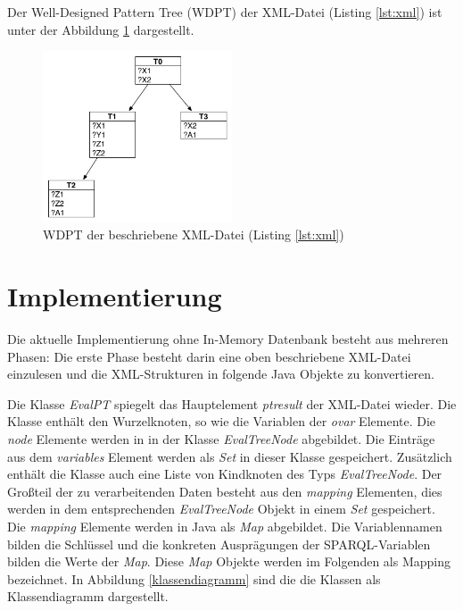 \documentclass[draft,final]{vutinfth} %
\begin{document}
Der Well-Designed Pattern Tree (WDPT) der XML-Datei (Listing \ref{lst:xml}) ist unter der Abbildung \ref{wdptBsp} dargestellt.
\begin{figure}[ht]
	\centering
	\includegraphics[width=0.5\textwidth]{WDPT}
	\caption{WDPT der beschriebene XML-Datei (Listing \ref{lst:xml})}
	\label{wdptBsp}
\end{figure}

\section{Implementierung} \label{istImp}

Die aktuelle Implementierung ohne In-Memory Datenbank besteht aus mehreren Phasen:
Die erste Phase besteht darin eine oben beschriebene XML-Datei einzulesen und die XML-Strukturen in folgende Java Objekte zu konvertieren.

Die Klasse \textit{EvalPT} spiegelt das Hauptelement \textit{ptresult} der XML-Datei wieder. Die Klasse enthält den Wurzelknoten, so wie die Variablen der \textit{ovar} Elemente. Die \textit{node} Elemente werden in in der Klasse \textit{EvalTreeNode} abgebildet. Die Einträge aus dem \textit{variables} Element werden als \textit{Set} in dieser Klasse gespeichert. Zusätzlich enthält die Klasse auch eine Liste von Kindknoten des Typs \textit{EvalTreeNode}. Der Gro\ss teil der zu verarbeitenden Daten besteht aus den \textit{mapping} Elementen, dies werden in dem entsprechenden \textit{EvalTreeNode} Objekt in einem \textit{Set} gespeichert. Die \textit{mapping} Elemente werden in Java als \textit{Map} abgebildet. Die Variablennamen bilden die Schlüssel und die konkreten Ausprägungen der SPARQL-Variablen bilden die Werte der \textit{Map}. Diese \textit{Map} Objekte werden im Folgenden als Mapping bezeichnet. In Abbildung \ref{klassendiagramm} sind die die Klassen als Klassendiagramm dargestellt. 
\end{document}
